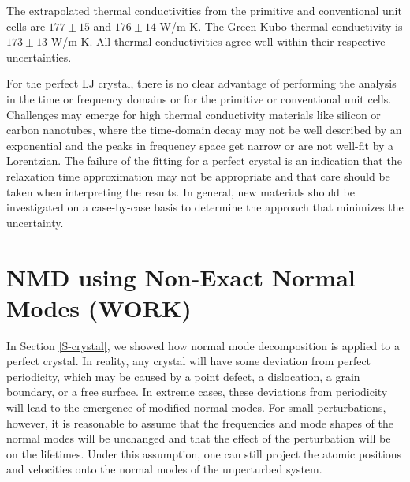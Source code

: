 
The extrapolated thermal conductivities from the primitive and 
conventional unit cells are $177 \pm 15$ and $176 \pm 14$ W/m-K. 
The Green-Kubo thermal conductivity is $173 \pm 13$ W/m-K. All thermal 
conductivities agree well within their respective uncertainties.

For the perfect LJ crystal, there is no clear advantage of performing 
the analysis in the time or frequency domains or for the primitive or 
conventional unit cells. Challenges may emerge for high thermal 
conductivity materials like silicon or carbon nanotubes, where the 
time-domain decay may not be well described by an exponential and the 
peaks in frequency space get narrow or are not well-fit by a Lorentzian. 
The failure of the fitting for a perfect crystal is an indication that 
the relaxation time approximation may not be appropriate and that care 
should be taken when interpreting the results. In general, new materials 
should be investigated on a case-by-case basis to determine the approach 
that minimizes the uncertainty.

\section{\label{A:NMD XCORR}NMD using Non-Exact Normal Modes (WORK)}

In Section \ref{S-crystal}, we showed how normal mode decomposition is 
applied to a perfect crystal. In reality, any crystal will have some 
deviation from perfect periodicity, which may be caused by a point defect, 
a dislocation, a grain boundary, or a free surface. In extreme cases, 
these deviations from periodicity will lead to the emergence of modified 
normal modes. For small perturbations, however, it is reasonable to
assume that the frequencies and mode shapes of the normal modes will 
be unchanged and that the effect of the perturbation will be on the 
lifetimes. Under this assumption, one can still project the atomic 
positions and velocities onto the normal modes of the unperturbed system.

